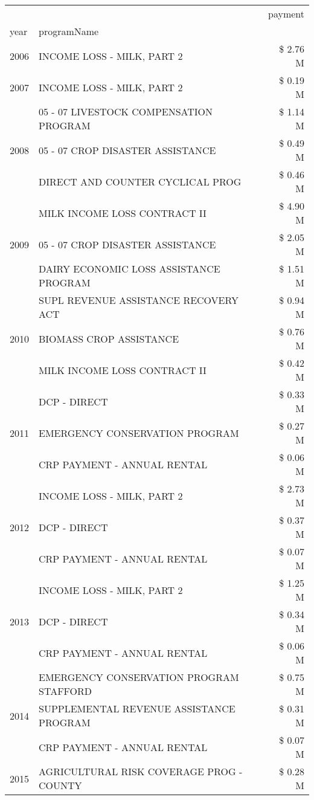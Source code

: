 \begin{tabular}{llr}
\toprule
 &  & payment \\
year & programName &  \\
\midrule
2006 & INCOME LOSS - MILK, PART 2 & \$ 2.76 M \\
\cline{1-3}
2007 & INCOME LOSS - MILK, PART 2 & \$ 0.19 M \\
\cline{1-3}
\multirow[t]{3}{*}{2008} & 05 - 07 LIVESTOCK COMPENSATION PROGRAM & \$ 1.14 M \\
 & 05 - 07 CROP DISASTER ASSISTANCE & \$ 0.49 M \\
 & DIRECT AND COUNTER CYCLICAL PROG & \$ 0.46 M \\
\cline{1-3}
\multirow[t]{3}{*}{2009} & MILK INCOME LOSS CONTRACT II & \$ 4.90 M \\
 & 05 - 07 CROP DISASTER ASSISTANCE & \$ 2.05 M \\
 & DAIRY ECONOMIC LOSS ASSISTANCE PROGRAM & \$ 1.51 M \\
\cline{1-3}
\multirow[t]{3}{*}{2010} & SUPL REVENUE ASSISTANCE RECOVERY ACT & \$ 0.94 M \\
 & BIOMASS CROP ASSISTANCE & \$ 0.76 M \\
 & MILK INCOME LOSS CONTRACT II & \$ 0.42 M \\
\cline{1-3}
\multirow[t]{3}{*}{2011} & DCP - DIRECT & \$ 0.33 M \\
 & EMERGENCY CONSERVATION PROGRAM & \$ 0.27 M \\
 & CRP PAYMENT - ANNUAL RENTAL & \$ 0.06 M \\
\cline{1-3}
\multirow[t]{3}{*}{2012} & INCOME LOSS - MILK, PART 2 & \$ 2.73 M \\
 & DCP - DIRECT & \$ 0.37 M \\
 & CRP PAYMENT - ANNUAL RENTAL & \$ 0.07 M \\
\cline{1-3}
\multirow[t]{3}{*}{2013} & INCOME LOSS - MILK, PART 2 & \$ 1.25 M \\
 & DCP - DIRECT & \$ 0.34 M \\
 & CRP PAYMENT - ANNUAL RENTAL & \$ 0.06 M \\
\cline{1-3}
\multirow[t]{3}{*}{2014} & EMERGENCY CONSERVATION PROGRAM STAFFORD & \$ 0.75 M \\
 & SUPPLEMENTAL REVENUE ASSISTANCE PROGRAM & \$ 0.31 M \\
 & CRP PAYMENT - ANNUAL RENTAL & \$ 0.07 M \\
\cline{1-3}
\multirow[t]{3}{*}{2015} & AGRICULTURAL RISK COVERAGE PROG - COUNTY & \$ 0.28 M \\

\end{tabular}

